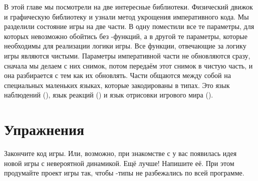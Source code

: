 В этой главе мы посмотрели на две интересные библиотеки.
Физический движок  и графическую библиотеку
 и узнали метод укрощения императивного
кода. Мы разделили состояние игры на две части. В одну
поместили все те параметры, для которых невозможно обойтись
без -функций, а в другой те параметры, которые
необходимы для реализации логики игры. Все функции,
отвечающие за логику игры являются чистыми. Параметры 
императивной части не обновляются сразу, сначала
мы делаем с них снимок, потом передаём этот снимок в
чистую часть, и она разбирается с тем как их обновлять.
Части общаются между собой на специальных маленьких языках,
которые закодированы в типах. Это язык наблюдений (),
язык реакций () и язык отрисовки игрового мира
().

\section{Упражнения}

Закончите код игры. Или, возможно, при знакомстве
с  у вас появилась идея новой игры с невероятной
динамикой. Ещё лучше! Напишите её. При этом продумайте проект
игры так, чтобы -типы не разбежались по всей программе. 


